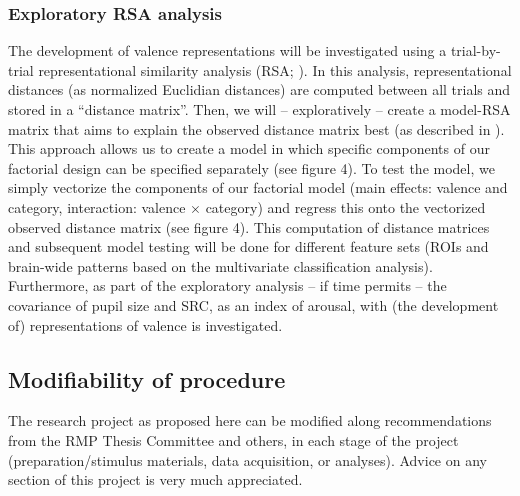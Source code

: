 \documentclass[12pt,a4paper]{article}\usepackage[]{graphicx}\usepackage[]{color}
\begin{document}
\subsubsection{Exploratory RSA analysis}
The development of valence representations will be investigated using a trial-by-trial representational similarity analysis (RSA; \citealp{kriegeskorte2008}). In this analysis, representational distances (as normalized Euclidian distances) are computed between all trials and stored in a ``distance matrix''. Then, we will -- exploratively -- create a model-RSA matrix that aims to explain the observed distance matrix best (as described in \citealp{walther2015}). This approach allows us to create a model in which specific components of our factorial design can be specified separately (see figure 4). To test the model, we simply vectorize the components of our factorial model (main effects: valence and category, interaction: valence $\times$ category) and regress this onto the vectorized observed distance matrix (see figure 4). This computation of distance matrices and subsequent model testing will be done for different feature sets (ROIs and brain-wide patterns based on the multivariate classification analysis). Furthermore, as part of the exploratory analysis -- if time permits -- the covariance of pupil size and SRC, as an index of arousal, with (the development of) representations of valence is investigated.

\subsection{Modifiability of procedure}
The research project as proposed here can be modified along recommendations from the RMP Thesis Committee and others, in each stage of the project (preparation/stimulus materials, data acquisition, or analyses). Advice on any section of this project is very much appreciated. \\
\end{document}
